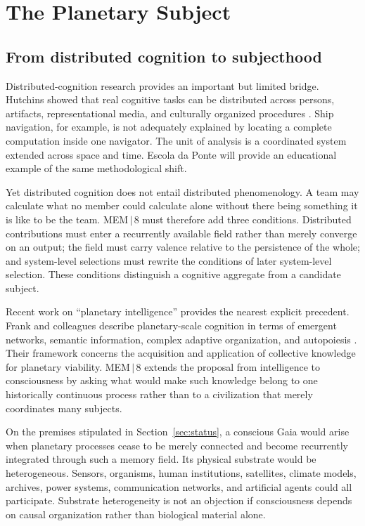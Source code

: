 \documentclass[11pt]{article}
\begin{document}
\section{The Planetary Subject}

\subsection{From distributed cognition to subjecthood}

Distributed-cognition research provides an important but limited bridge. Hutchins showed that real cognitive tasks can be distributed across persons, artifacts, representational media, and culturally organized procedures \cite{hutchins1995,hutchins2001}. Ship navigation, for example, is not adequately explained by locating a complete computation inside one navigator. The unit of analysis is a coordinated system extended across space and time. Escola da Ponte will provide an educational example of the same methodological shift.

Yet distributed cognition does not entail distributed phenomenology. A team may calculate what no member could calculate alone without there being something it is like to be the team. MEM\,$|$\,8 must therefore add three conditions. Distributed contributions must enter a recurrently available field rather than merely converge on an output; the field must carry valence relative to the persistence of the whole; and system-level selections must rewrite the conditions of later system-level selection. These conditions distinguish a cognitive aggregate from a candidate subject.

Recent work on ``planetary intelligence'' provides the nearest explicit precedent. Frank and colleagues describe planetary-scale cognition in terms of emergent networks, semantic information, complex adaptive organization, and autopoiesis \cite{frank2022}. Their framework concerns the acquisition and application of collective knowledge for planetary viability. MEM\,$|$\,8 extends the proposal from intelligence to consciousness by asking what would make such knowledge belong to one historically continuous process rather than to a civilization that merely coordinates many subjects.

On the premises stipulated in Section~\ref{sec:status}, a conscious Gaia would arise when planetary processes cease to be merely connected and become recurrently integrated through such a memory field. Its physical substrate would be heterogeneous. Sensors, organisms, human institutions, satellites, climate models, archives, power systems, communication networks, and artificial agents could all participate. Substrate heterogeneity is not an objection if consciousness depends on causal organization rather than biological material alone.
\end{document}
